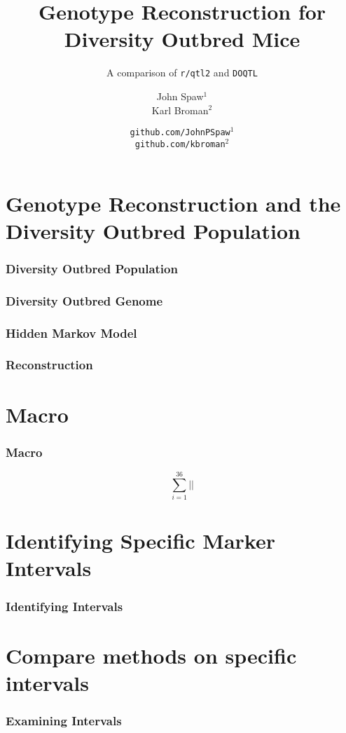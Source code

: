 \documentclass[12pt,t]{beamer}
\title{\Huge Genotype Reconstruction for Diversity Outbred Mice}
\subtitle{\Large A comparison of \texttt{r/qtl2} and \texttt{DOQTL}}
\author{\large John Spaw$^1$\\  Karl Broman$^2$}
\date{\texttt{github.com/JohnPSpaw}$^1$ \\ \texttt{github.com/kbroman}$^2$}
\begin{document}
\frame{\titlepage}


\section[Outline]{}



\section{Genotype Reconstruction and the Diversity Outbred Population}

	\frame
	{
	  \frametitle{Diversity Outbred Population}
		
	}
	
	\frame
	{
	  \frametitle{Diversity Outbred Genome}
		
	}
	
	\frame
	{
	  \frametitle{Hidden Markov Model}
		
	}
	
	\frame
	{
	  \frametitle{Reconstruction}
		
	}

\section{Macro}
	\frame
	{
	  \frametitle{Macro}
		$$ \sum_{i=1}^{36} | | $$
	}


\section{Identifying Specific Marker Intervals}
	\frame
	{
	  \frametitle{Identifying Intervals}
		
	}

\section{Compare methods on specific intervals}
	\frame
	{
	  \frametitle{Examining Intervals}
		
	}
\end{document}
